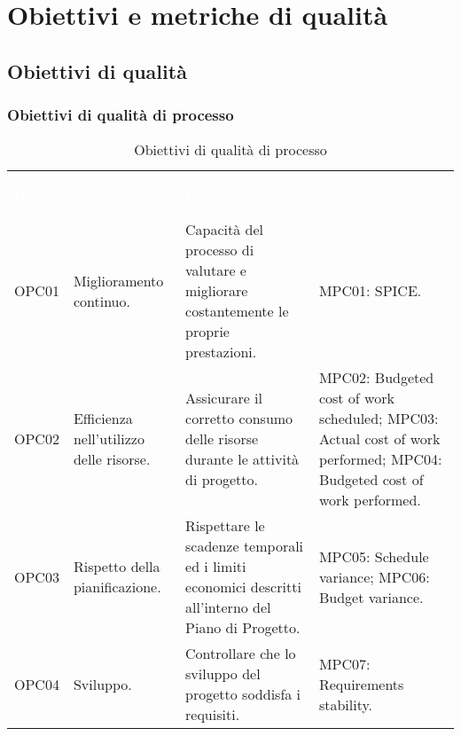 \section{Obiettivi e metriche di qualità}

\subsection{Obiettivi di qualità}

\subsubsection{Obiettivi di qualità di processo}

\begin{table}[H]
    \renewcommand{\arraystretch}{1.5}
    \begin{tabular}{ m{}<{\centering}  m{}<{\centering}  m{}<{\centering}  m{}<{\centering} }
        \rowcolor{darkblue}
        \textcolor{white}{\textbf{ID}} &\textcolor{white}{\textbf{Nome}}& \textcolor{white}{\textbf{Descrizione}} & \textcolor{white}{\textbf{Metriche associate}}\\ 
        
        OPC01 & 
        Miglioramento continuo. &
        Capacità del processo di valutare e migliorare costantemente le proprie prestazioni. &
        MPC01: SPICE. \\
        
        \rowcolor{gray!25}
        OPC02 &
        Efficienza nell’utilizzo delle risorse. &
        Assicurare il corretto consumo delle risorse durante le attività di progetto. &
        MPC02: Budgeted cost of work scheduled; \newline
        MPC03: Actual cost of work performed; \newline
        MPC04: Budgeted cost of work performed. \\

        OPC03 &
        Rispetto della pianificazione. &
        Rispettare le scadenze temporali ed i limiti economici descritti all’interno del Piano di Progetto. &
        MPC05: Schedule variance; \newline
        MPC06: Budget variance. \\

        \rowcolor{gray!25}
        OPC04 &
        Sviluppo. &
        Controllare che lo sviluppo del progetto soddisfa i requisiti. &
        MPC07: Requirements stability. \\

    \end{tabular}
    \caption{Obiettivi di qualità di processo}
\end{table}

